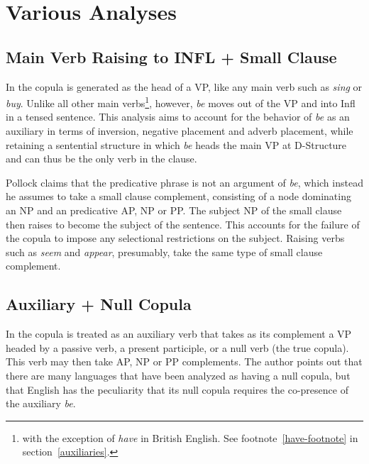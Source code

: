 

\section{Various Analyses}
\label{sm-clause-other-analyses}

\subsection{Main Verb Raising to INFL + Small Clause}

In \cite{pollack89} the copula is generated as the head of a VP, like any main
verb such as {\it sing} or {\it buy}. Unlike all other main verbs\footnote{with
the exception of {\it have} in British English. See
footnote~\ref{have-footnote} in section~\ref{auxiliaries}.}, however, {\it be}
moves out of the VP and into Infl in a tensed sentence.  This analysis aims to
account for the behavior of {\it be} as an auxiliary in terms of inversion,
negative placement and adverb placement, while retaining a sentential structure
in which {\it be} heads the main VP at D-Structure and can thus be the only
verb in the clause.

Pollock claims that the predicative phrase is not an argument of {\it be},
which instead he assumes to take a small clause complement, consisting of a
node dominating an NP and an predicative AP, NP or PP. The subject NP of the
small clause then raises to become the subject of the sentence.  This accounts
for the failure of the copula to impose any selectional restrictions on the
subject.  Raising verbs such as {\it seem} and {\it appear}, presumably, take the
same type of small clause complement.

\subsection{Auxiliary + Null Copula}
\label{la}

In \cite{lapointe80} the copula is treated as an auxiliary verb that takes as its
complement a VP headed by a passive verb, a present participle, or a null verb
(the true copula). This verb may then take AP, NP or PP complements.  The
author points out that there are many languages that have been analyzed as
having a null copula, but that English has the peculiarity that its
null copula requires the co-presence of the auxiliary {\it be}.

